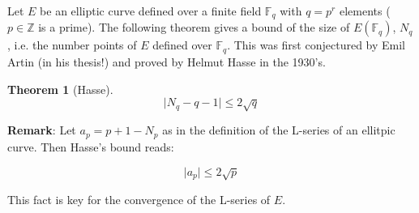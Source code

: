 \documentclass[12pt]{article}
\newtheorem{thm}{Theorem}
\newcommand{\Ints}{\mathbb{Z}}
\begin{document}
Let $E$ be an elliptic curve defined over a finite field
$\mathbb{F}_q$ with $q=p^r$ elements ($p\in\Ints$ is a prime). The
following theorem gives a bound of the size of $E(\mathbb{F}_q)$,
$N_q$, i.e. the number points of $E$ defined over $\mathbb{F}_q$.
This was first conjectured by Emil Artin (in his thesis!) and
proved by Helmut Hasse in the 1930's.

\begin{thm}[Hasse]
$$\mid N_q -q -1 \mid \leq 2\sqrt{q} $$
\end{thm}

{\bf Remark}: Let $a_p=p+1-N_p$ as in the definition of the
L-series of an ellitpic curve. Then Hasse's bound reads:

$$\mid a_p \mid \leq 2\sqrt{p}$$

This fact is key for the convergence of the L-series of $E$.
\end{document}
